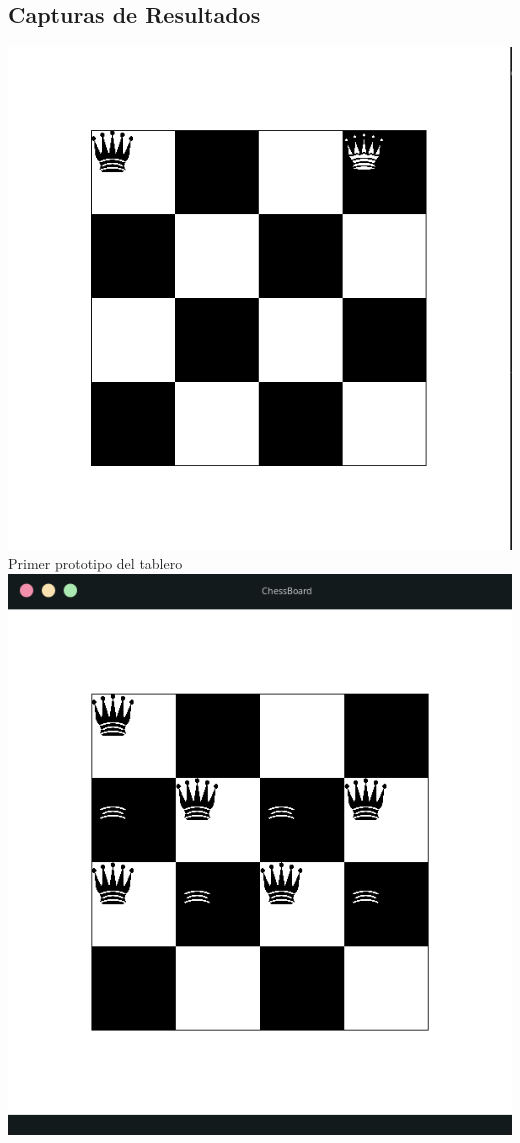 \documentclass{article}
\begin{document}
\subsection*{Capturas de Resultados}
\begin{center}
    \includegraphics[width=\textwidth]{Practica7-capt1.png}
    Primer prototipo del tablero
    \includegraphics[width=\textwidth]{Practica7-capt2.png}

\end{center}
\end{document}
